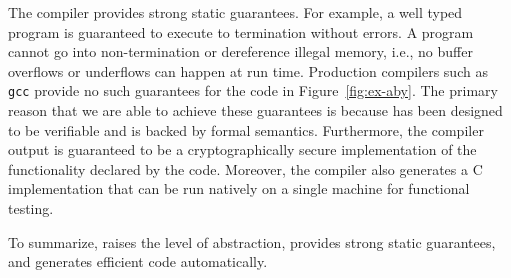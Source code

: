 The \tool compiler provides strong static guarantees. For example, a well typed
\tool program is guaranteed to execute to termination without errors. A \tool program cannot go into non-termination or dereference illegal memory, i.e., no buffer overflows or underflows can happen at run time. Production compilers such as {\tt gcc} provide no such guarantees
for the code in Figure~\ref{fig:ex-aby}.
The primary reason that we are able to achieve these guarantees is because
\tool has been designed to be verifiable and is backed by formal semantics. 
Furthermore, the compiler output is guaranteed to be a cryptographically secure
implementation of the functionality declared by the \tool code. 
Moreover, the \tool compiler also generates a C implementation that can be run natively on a single machine for functional testing. 

To summarize, \tool raises the level of abstraction, provides strong static guarantees, and generates efficient code automatically.
